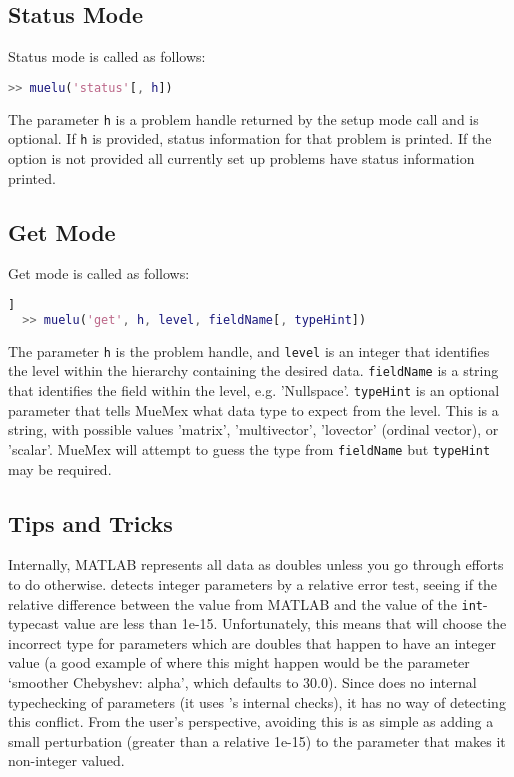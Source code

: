 \subsection{Status Mode}
Status mode is called as follows:
\begin{lstlisting}[language=Matlab]
  >> muelu('status'[, h])
\end{lstlisting}
The parameter \texttt{h} is a problem handle returned by the
setup mode call and is optional.  If \texttt{h} is provided, status
information for that problem is printed.  If the option is not provided all currently
set up problems have status information printed.

\subsection{Get Mode}
Get mode is called as follows:
\begin{lstlisting}[language=Matlab]]
  >> muelu('get', h, level, fieldName[, typeHint])
\end{lstlisting}
The parameter \texttt{h} is the problem handle, and \texttt{level}
is an integer that identifies the level within the hierarchy containing
the desired data. \texttt{fieldName} is a string that identifies the
field within the level, e.g. 'Nullspace'. \texttt{typeHint} is an optional
parameter that tells MueMex what data type to expect from the level. This
is a string, with possible values 'matrix', 'multivector', 'lovector' (ordinal
vector), or 'scalar'. MueMex will attempt to guess the type from \texttt{fieldName}
but \texttt{typeHint} may be required.

\subsection{Tips and Tricks }\label{sec:muemex:tips}

Internally, MATLAB represents all data as doubles unless you go
through efforts to do otherwise.  \muemex detects integer parameters by
a relative error test, seeing if the relative difference between the
value from MATLAB and the value of the \texttt{int}-typecast value are
less than 1e-15.  Unfortunately, this means that \muemex will choose the
incorrect type for parameters which are doubles that happen to have an
integer value (a good example of where this might happen would be the parameter
`smoother Chebyshev: alpha', which defaults to 30.0).  Since \muemex does no
internal typechecking of
parameters (it uses \muelu's internal checks), it has no way of detecting
this conflict.  From the user's perspective, avoiding this is as
simple as adding a small perturbation (greater than a relative 1e-15)
to the parameter that makes it non-integer valued.
